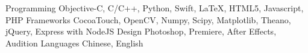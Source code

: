 \begin{cvskills}
  \cvskill
    {Programming}
    {Objective-C, C/C++, Python, Swift, LaTeX, HTML5, Javascript, PHP}
  \cvskill
    {Frameworks}
    {CocoaTouch, OpenCV, Numpy, Scipy, Matplotlib, Theano, jQuery, Express with NodeJS}
  \cvskill
  	{Design}
	{Photoshop, Premiere, After Effects, Audition}
  \cvskill
    {Languages}
    {Chinese, English}
\end{cvskills}
